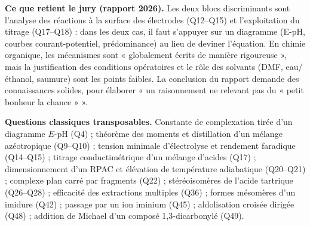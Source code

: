 \documentclass[11pt,a4paper]{article}
\begin{document}
\textbf{Ce que retient le jury (rapport 2026).} Les deux blocs discriminants sont l'analyse des réactions à la surface des électrodes (Q12--Q15) et l'exploitation du titrage (Q17--Q18) : dans les deux cas, il faut s'appuyer sur un diagramme (E-pH, courbes courant-potentiel, prédominance) au lieu de deviner l'équation. En chimie organique, les mécanismes sont « globalement écrits de manière rigoureuse », mais la justification des conditions opératoires et le rôle des solvants (DMF, eau/éthanol, saumure) sont les points faibles. La conclusion du rapport demande des connaissances solides, pour élaborer « un raisonnement ne relevant pas du « petit bonheur la chance » ».

\textbf{Questions classiques transposables.} Constante de complexation tirée d'un diagramme \(E\)-pH (Q4) ; théorème des moments et distillation d'un mélange azéotropique (Q9--Q10) ; tension minimale d'électrolyse et rendement faradique (Q14--Q15) ; titrage conductimétrique d'un mélange d'acides (Q17) ; dimensionnement d'un RPAC et élévation de température adiabatique (Q20--Q21) ; complexe plan carré par fragments (Q22) ; stéréoisomères de l'acide tartrique (Q26--Q28) ; efficacité des extractions multiples (Q36) ; formes mésomères d'un imidure (Q42) ; passage par un ion iminium (Q45) ; aldolisation croisée dirigée (Q48) ; addition de Michael d'un composé 1,3-dicarbonylé (Q49).
\end{document}
